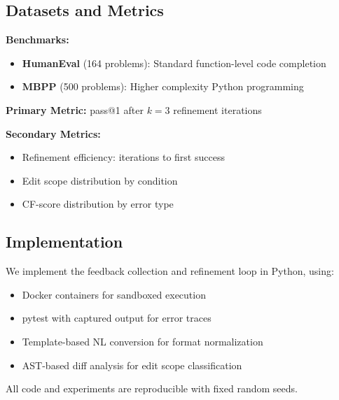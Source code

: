 \subsection{Datasets and Metrics}

\textbf{Benchmarks:}
\begin{itemize}
\item \textbf{HumanEval} (164 problems): Standard function-level code completion~\cite{chen2021evaluating}
\item \textbf{MBPP} (500 problems): Higher complexity Python programming~\cite{austin2021program}
\end{itemize}

\textbf{Primary Metric:} pass@1 after $k=3$ refinement iterations

\textbf{Secondary Metrics:}
\begin{itemize}
\item Refinement efficiency: iterations to first success
\item Edit scope distribution by condition
\item CF-score distribution by error type
\end{itemize}

\subsection{Implementation}

We implement the feedback collection and refinement loop in Python, using:
\begin{itemize}
\item Docker containers for sandboxed execution
\item pytest with captured output for error traces
\item Template-based NL conversion for format normalization
\item AST-based diff analysis for edit scope classification
\end{itemize}

All code and experiments are reproducible with fixed random seeds.
